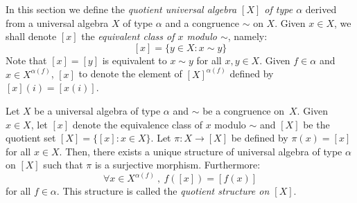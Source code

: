 In this section we define the {\em quotient universal algebra $[X]$
of type $\alpha$} derived from a universal algebra $X$ of type
$\alpha$ and a congruence $\sim$ on $X$. Given $x\in X$, we shall
denote $[x]$ the {\em equivalent class of $x$ modulo $\sim$},
namely:
    \[
    [x]=\{y\in X:x\sim y\}
    \]
Note that $[x]=[y]$ is equivalent to $x\sim y$ for all $x,y\in X$.
Given $f\in\alpha$ and $x\in X^{\alpha(f)}$, $[x]$ to denote the
element of $[X]^{\alpha(f)}$ defined by $[x](i)=[x(i)]$.
\begin{theorem}\label{logic:the:quotient}
Let $X$ be a universal algebra of type $\alpha$ and $\sim$ be a
congruence on~$X$. Given $x\in X$, let $[x]$ denote the equivalence
class of $x$ modulo $\sim$ and $[X]$ be the quotient set $[X] =
\{[x]:x\in X\}$. Let $\pi:X\to[X]$ be defined by $\pi(x)=[x]$ for
all $x\in X$. Then, there exists a unique structure of universal
algebra of type $\alpha$ on $[X]$ such that $\pi$ is a surjective
morphism. Furthermore:
    \begin{equation}\label{logic:eqn:quotient}
    \forall x\in X^{\alpha(f)}\ ,\ f([x]) = [f(x)]
    \end{equation}
for all $f\in\alpha$. This structure is called the {\em quotient
structure on $[X]$}.
\end{theorem}
